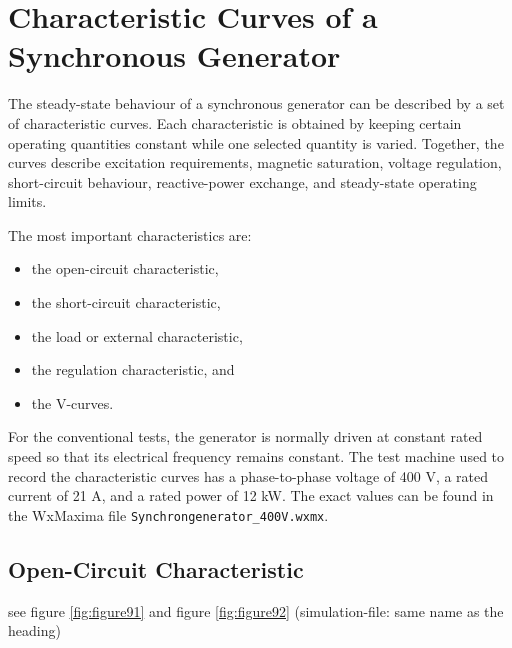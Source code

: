 
\chapter{Characteristic Curves of a Synchronous Generator}
\label{chap:sg-characteristic-curves}

The steady-state behaviour of a synchronous generator can be described by a
set of characteristic curves. Each characteristic is obtained by keeping
certain operating quantities constant while one selected quantity is varied.
Together, the curves describe excitation requirements, magnetic saturation,
voltage regulation, short-circuit behaviour, reactive-power exchange, and
steady-state operating limits.

The most important characteristics are:

\begin{itemize}
  \item the open-circuit characteristic,
  \item the short-circuit characteristic,
  \item the load or external characteristic,
  \item the regulation characteristic, and
  \item the V-curves.
\end{itemize}

For the conventional tests, the generator is normally driven at constant rated
speed so that its electrical frequency remains constant. The test machine used to record the characteristic curves has a phase-to-phase voltage of 400 V, a rated current of 21 A, and a rated power of 12 kW. The exact values can be found in the WxMaxima file \texttt{Synchrongenerator\_400V.wxmx}. 

\section{Open-Circuit Characteristic} see figure \ref{fig:figure91} and figure \ref{fig:figure92}  (simulation-file: same name as the heading)
\label{sec:sg-occ}

